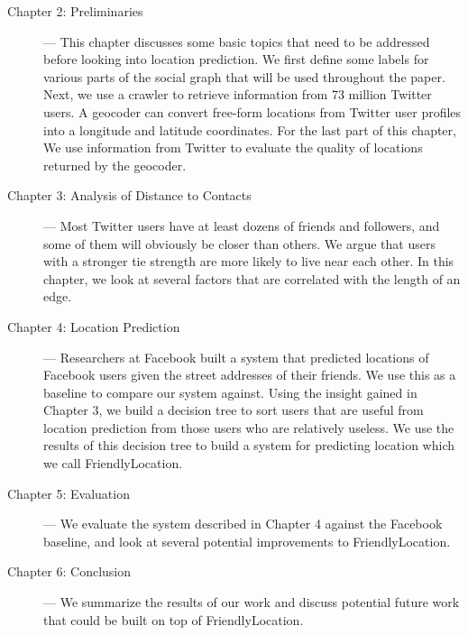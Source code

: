 \begin{description}
\item[Chapter 2: Preliminaries] --- This chapter discusses some basic topics
    that need to be addressed before looking into location prediction.
    We first define some labels for various parts of the social graph that will
    be used throughout the paper.
    Next, we use a crawler to retrieve information from 73 million Twitter
    users.
    A geocoder can convert free-form locations from Twitter user profiles into
    a longitude and latitude coordinates.
    For the last part of this chapter, We use information from Twitter to
    evaluate the quality of locations returned by the geocoder.
\item[Chapter 3: Analysis of Distance to Contacts] ---
    Most Twitter users have at least dozens of friends and followers, and some
    of them will obviously be closer than others.
    We argue that users with a stronger tie strength are more likely to live
    near each other.
    In this chapter, we look at several factors that are correlated with the
    length of an edge.
\item[Chapter 4: Location Prediction] --- Researchers at Facebook built a
    system that predicted locations of Facebook users given the street
    addresses of their friends.
    We use this as a baseline to compare our system against.
    Using the insight gained in Chapter 3, we build a decision tree to sort
    users that are useful from location prediction from those users who are
    relatively useless.
    We use the results of this decision tree to build a system for predicting
    location which we call FriendlyLocation.
\item[Chapter 5: Evaluation] --- We evaluate the system described in Chapter 4
    against the Facebook baseline, and look at several potential improvements
    to FriendlyLocation.
\item[Chapter 6: Conclusion] --- We summarize the results of our work and
    discuss potential future work that could be built on top of
    FriendlyLocation.

\end{description}


